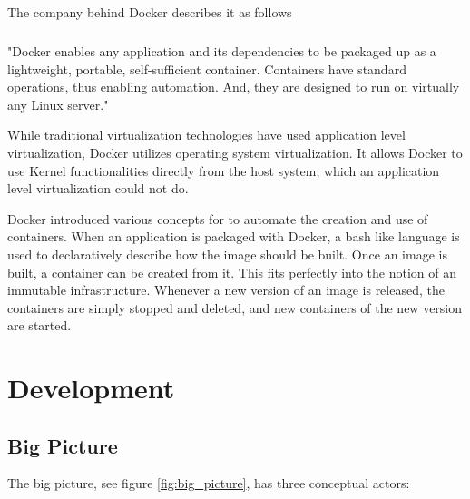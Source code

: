 The company behind Docker describes it as follows

\paragraph{}{"Docker enables any application and its dependencies to be packaged up as a
lightweight, portable, self-sufficient container. Containers have standard
operations, thus enabling automation. And, they are designed to run on
virtually any Linux server."\cite{docker_quote}\newline}

While traditional virtualization technologies have used application level
virtualization, Docker utilizes operating system virtualization. It allows
Docker to use Kernel functionalities directly from the host system, which
an application level virtualization could not do.

Docker introduced various concepts for to automate the creation and use of
containers. When an application is packaged with Docker, a bash like language
is used to declaratively describe how the image should be built. Once an image
is built, a container can be created from it. This fits perfectly into the
notion of an immutable infrastructure. Whenever a new version of an image is
released, the containers are simply stopped and deleted, and new containers of
the new version are started.

\chapter{Development}

\section{Big Picture}

The big picture, see figure \ref{fig:big_picture}, has three conceptual actors:

